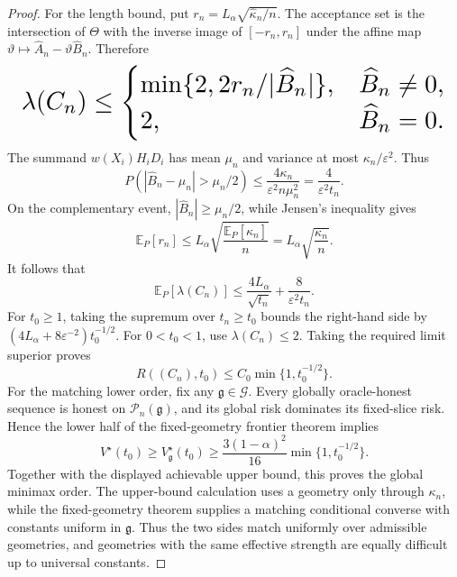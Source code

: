 \documentclass{article}
\begin{document}
\begin{proof}
For the length bound, put \(r_n=L_\alpha\sqrt{\widehat\kappa_n/n}\). The acceptance set is the intersection of \(\Theta\) with the inverse image of \([-r_n,r_n]\) under the affine map \(\vartheta\mapsto\widehat A_n-\vartheta\widehat B_n\). Therefore
\[
\makebox[\linewidth][c]{\resizebox{0.98\linewidth}{!}{\(\displaystyle \lambda(C_n)\le
 \begin{cases}
 \min\{2,2r_n/|\widehat B_n|\},&\widehat B_n\ne0,\\
 2,&\widehat B_n=0.
 \end{cases}\)}}
\]
The summand \(w(X_i)H_iD_i\) has mean \(\mu_n\) and variance at most \(\kappa_n/\varepsilon^2\). Thus
\[
 P(|\widehat B_n-\mu_n|>\mu_n/2)
 \le\frac{4\kappa_n}{\varepsilon^2n\mu_n^2}
 =\frac4{\varepsilon^2t_n}.
\]
On the complementary event, \(|\widehat B_n|\ge\mu_n/2\), while Jensen's inequality gives
\[
 \mathbb E_P[r_n]
 \le L_\alpha\sqrt{\frac{\mathbb E_P[\widehat\kappa_n]}n}
 =L_\alpha\sqrt{\frac{\kappa_n}{n}}.
\]
It follows that
\[
 \mathbb E_P[\lambda(C_n)]
 \le\frac{4L_\alpha}{\sqrt{t_n}}
 +\frac8{\varepsilon^2t_n}.
\]
For \(t_0\ge1\), taking the supremum over \(t_n\ge t_0\) bounds the right-hand side by \((4L_\alpha+8\varepsilon^{-2})t_0^{-1/2}\). For \(0<t_0<1\), use \(\lambda(C_n)\le2\). Taking the required limit superior proves
\[
 R((C_n),t_0)
 \le C_0\min\{1,t_0^{-1/2}\}.
\]
For the matching lower order, fix any \(\mathfrak g\in\mathcal G\). Every globally oracle-honest sequence is honest on \(\mathcal P_n(\mathfrak g)\), and its global risk dominates its fixed-slice risk. Hence the lower half of the fixed-geometry frontier theorem implies
\[
 V^\star(t_0)\ge V_{\mathfrak g}^\star(t_0)
 \ge\frac{3(1-\alpha)^2}{16}
 \min\{1,t_0^{-1/2}\}.
\]
Together with the displayed achievable upper bound, this proves the global minimax order. The upper-bound calculation uses a geometry only through \(\kappa_n\), while the fixed-geometry theorem supplies a matching conditional converse with constants uniform in \(\mathfrak g\). Thus the two sides match uniformly over admissible geometries, and geometries with the same effective strength are equally difficult up to universal constants.
\end{proof}
\end{document}
